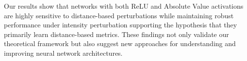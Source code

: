 Our results show that networks with both ReLU and Absolute Value activations are highly sensitive to distance-based perturbations while maintaining robust performance under intensity perturbation supporting the hypothesis that they primarily learn distance-based metrics. These findings not only validate our theoretical framework but also suggest new approaches for understanding and improving neural network architectures.